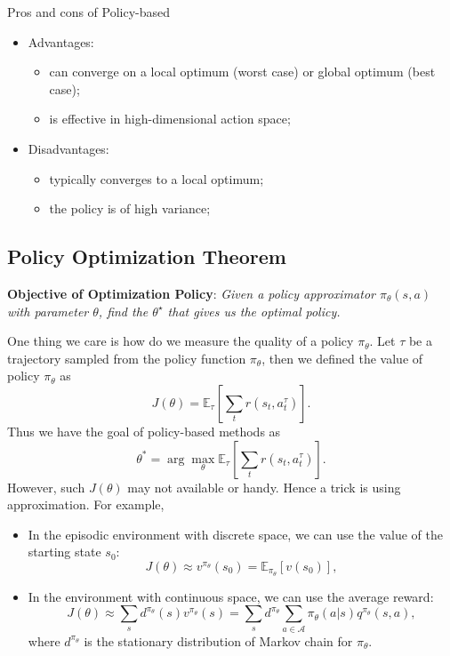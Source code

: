 \documentclass{progartcn}
\begin{document}
	Pros and cons of Policy-based
	\begin{itemize}[noitemsep,topsep=0pt]
		\item Advantages:
		\begin{itemize}[noitemsep,topsep=0pt]
			\item can converge on a local optimum (worst case) or global optimum (best case);
			\item is effective in high-dimensional action space;
		\end{itemize}
		\item Disadvantages:
		\begin{itemize}[noitemsep,topsep=0pt]
			\item typically converges to a local optimum;
			\item the policy is of high variance;\\
		\end{itemize}
	\end{itemize}

	\subsection{Policy Optimization Theorem}

		\textbf{Objective of Optimization Policy}: \textit{Given a policy approximator $\pi_θ(s,a)$ with parameter $\theta$, find the $\theta^\star$ that gives us the optimal policy.}

		One thing we care is how do we measure the quality of a policy $\pi_\theta$. Let $\tau$ be a trajectory sampled from the policy function $\pi_\theta$, then we defined the value of policy $\pi_\theta$ as
		\[J(\theta)=\mathbb{E}_{\tau}\left[\sum_t r(s_t, a_t^\tau)\right].\]
		Thus we have the goal of policy-based methods as
		\[\theta^\ast =\arg\max_{\theta}\mathbb{E}_{\tau}\left[\sum_t r(s_t, a_t^\tau)\right].\]
		However, such $J(\theta)$ may not available or handy. Hence a trick is using approximation. For example,
		\begin{itemize}[noitemsep,topsep=0pt]
			\item In the episodic environment with discrete space, we can use the value of the starting state $s_0$:
			\[J(\theta)\approx v^{\pi_\theta}(s_0)=\mathbb{E}_{\pi_\theta}[v(s_0)],\]
			\item In the environment with continuous space, we can use the average reward:
			\[J(\theta)\approx \sum_s d^{\pi_\theta}(s)v^{\pi_\theta}(s)=\sum_{s}d^{\pi_\theta}\sum_{a\in\mathcal{A}}\pi_\theta(a|s)q^{\pi_\theta}(s,a),\]
			where $d^{\pi_\theta}$ is the stationary distribution of Markov chain for $\pi_\theta$.\\
		\end{itemize}
\end{document}
